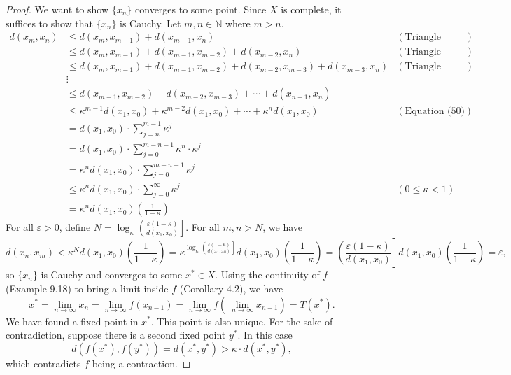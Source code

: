 \documentclass{article}
\newcommand{\N}{\mathbb{N}}
\theoremstyle{definition}
\begin{document}
\begin{proof}
		We want to show $ \{x_n\} $ converges to some point. Since $ X $ is complete, it suffices to show that $ \{x_n\}  $ is Cauchy. Let $ m,n\in\N $ where $ m > n $. 
		\begin{align*}
			d(x_m,x_n) &\le d(x_m,x_{m-1}) + d(x_{m-1}, x_n) &(\text{Triangle Inequality})\\  & \le d(x_m,x_{m-1}) + d(x_{m-1}, x_{m-2})+ d(x_{m-2}, x_n)&(\text{Triangle Inequality})\\
			&  \le d(x_m,x_{m-1}) + d(x_{m-1}, x_{m-2})+  d(x_{m-2}, x_{m-3})+ d(x_{m-3}, x_n)&(\text{Triangle Inequality})\\ & \vdots  \\  & \le  d(x_{m-1}, x_{m-2}) +d(x_{m-2}, x_{m-3})  +  \cdots + d(x_{n+1}, x_n) \\  &\le   \kappa^{m-1}d(x_1, x_0) +  \kappa^{m-2}d(x_1, x_0) + \cdots +  \kappa^{n}d(x_1, x_0)&(\text{Equation (50)})\\ & = d(x_1,x_0)\cdot \textstyle\sum_{j=n}^{m-1}\kappa^j \\ 
			& = d(x_1,x_0)\cdot \textstyle\sum_{j=0}^{m-n-1}\kappa^n\cdot \kappa^j \\
			& = \kappa^nd(x_1,x_0)\cdot \textstyle\sum_{j=0}^{m-n-1}\kappa^j  \\
			& \le \kappa^nd(x_1,x_0)\cdot \textstyle\sum_{j=0}^{\infty}\kappa^j& (0\le \kappa < 1)\\
			& = \kappa^nd(x_1,x_0)\left(\frac{1}{1-\kappa}\right)
		\end{align*}
		For all $ \varepsilon > 0 $, define $ N = \log_\kappa\left(\frac{\varepsilon(1-\kappa)}{d(x_1,x_0)}\right] $. For all $ m,n > N $, we have 
		$$ d(x_n,x_m) < \kappa^Nd(x_1,x_0)\left(\frac{1}{1-\kappa}\right) = \kappa^{\log_\kappa\left(\frac{\varepsilon(1-\kappa)}{d(x_1,x_0)}\right] }d(x_1,x_0)\left(\frac{1}{1-\kappa}\right) = \left(\frac{\varepsilon(1-\kappa)}{d(x_1,x_0)}\right]d(x_1,x_0)\left(\frac{1}{1-\kappa}\right) = \varepsilon, $$ so $ \{x_n\} $ is Cauchy and converges to some $ x^*\in X $. Using the continuity of $ f $ (Example 9.18) to bring a limit inside $ f $ (Corollary 4.2), we have $$ x^* = \lim\limits_{n\to\infty} x_n = \lim\limits_{n\to\infty} f(x_{n-1}) = \lim\limits_{n\to\infty} f\left(\ \lim\limits_{n\to\infty} x_{n-1}\right) = T(x^*).$$ We have found a fixed point in $ x^* $. This point is also unique. For the sake of contradiction, suppose there is a second fixed point $ y^* $. In this case 
		$$d(f(x^*), f(y^*))= d(x^*, y^*) > \kappa\cdot d(x^*,y^*),$$ which contradicts $ f $ being a contraction.
	\end{proof}
	
\end{document}
